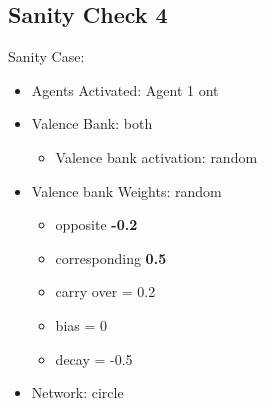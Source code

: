 \documentclass{article}\usepackage[]{graphicx}\usepackage[]{color}
\begin{document}
\subsection{Sanity Check 4}
\label{sec:sanity4}
Sanity Case:
\begin{itemize}
  \item Agents Activated: Agent 1 ont
  \item Valence Bank: both
  \begin{itemize}
      \item Valence bank activation: random
  \end{itemize}
  \item Valence bank Weights: random
  \begin{itemize}
      \item opposite \textbf{-0.2}
      \item corresponding \textbf{0.5}
      \item carry over = 0.2
      \item bias = 0
      \item decay = -0.5
  \end{itemize}
  \item Network: circle
\end{itemize}
\end{document}
